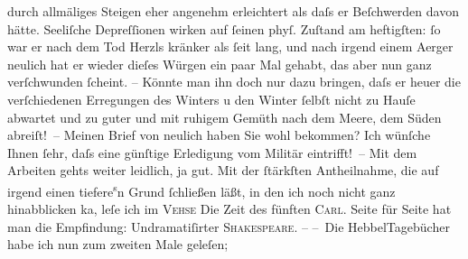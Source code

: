 \begin{ledgroupsized}[t]{13cm}
               durch allmäliges Steigen eher angenehm erleichtert als daſs er Beſchwerden davon
               hätte. {\pb}Seeliſche Depreſſionen wirken auf ſeinen phyſ.
               Zuſtand am heftigſten: ſo war er nach dem Tod Herzls kränker als ſeit lang, und nach irgend einem Aerger neulich hat er
               wieder dieſes Würgen ein paar Mal gehabt, das aber nun ganz verſchwunden ſcheint. –
               Könnte man ihn doch nur dazu bringen, daſs er heuer die verſchiedenen Erregungen des
               Winters \introOben{}u den Winter ſelbſt\introOben{} nicht zu Hauſe abwartet und zu
               guter \label{T_L01424_2v}\label{T_L01424_2h} und mit ruhigem Gemüth
                  {\pb}nach dem Meere, dem Süden abreiſt! –\pend
           \pstart
           Meinen Brief von neulich haben Sie wohl bekommen? Ich wünſche Ihnen ſehr, daſs eine
               günſtige Erledigung vom Militär eintrifft! –\pend
           \pstart
           Mit dem Arbeiten gehts weiter leidlich, ja gut. Mit der ſtärkſten Antheilnahme, die
               auf irgend ein\introOben{}en\introOben{} tiefere\substVorne{}\textsuperscript{s}\substDazwischen{}n\substHinten{} Grund ſchließen läßt, in den ich noch nicht ganz hinabblicken ka{\geminationn}, leſe ich im \textsc{Vehse}{ }{\pb}Die Zeit des fünften \textsc{Carl}. Seite für Seite hat man die Empfindung: Undramatiſirter \textsc{Shakespeare}. –\pend
           \pstart
           – Die HebbelTagebücher habe ich nun zum zweiten Male geleſen;

\end{ledgroupsized}
